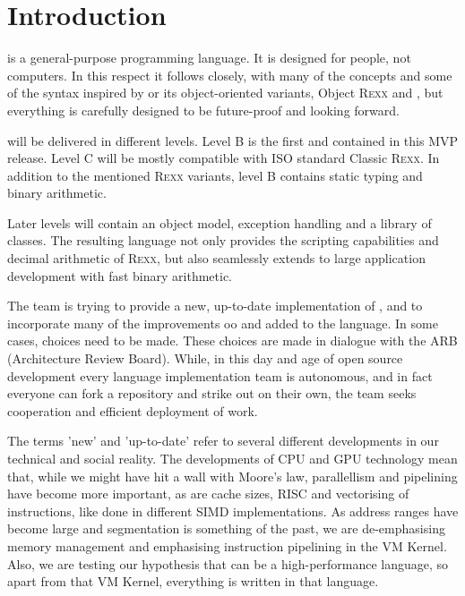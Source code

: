 \chapter{Introduction}

\crexx{} is a general-purpose programming language. It is designed for
people, not computers. In this respect it follows \rexx{} closely, with
many of the concepts and some of the syntax inspired by \rexx{}
or its object-oriented variants, Object R\textsc{exx} and \nr{}, but
everything is carefully designed to be future-proof and looking
forward.

\crexx{} will be delivered in different levels. Level B is the first and
contained in this MVP release. Level C will be mostly compatible with
ISO standard Classic \textsc{Rexx}. 
In addition to the mentioned \textsc{Rexx} variants, \crexx{} level B contains 
static typing and binary arithmetic.

Later levels will contain an object model, exception
handling and a library of classes. The resulting language not only provides the scripting
capabilities and decimal arithmetic of R\textsc{exx}, but also seamlessly
extends to large application development with fast binary arithmetic.

The \crexx{} team is trying to provide a new, up-to-date
implementation of \rexx{}, and to incorporate many of the improvements
oo\rexx{} and \nr{} added to the language. In some cases, choices
need to be made. These choices are made in dialogue with the \rexx ARB
(Architecture Review Board). While, in this day and age of open source
development every language implementation team is autonomous, and in
fact everyone can fork a repository and strike out on their own, the
\crexx{} team seeks cooperation and efficient deployment of work.

The terms 'new' and 'up-to-date' refer to several different
developments in our technical and social reality. The developments of
CPU and GPU technology mean that, while we might have hit a wall with
Moore's law, parallellism and pipelining have become more important,
as are cache sizes, RISC and vectorising of instructions, like done in
different SIMD implementations. As address ranges have become large
and segmentation is something of the past, we are de-emphasising
memory management and emphasising instruction pipelining in the
\crexx{} VM Kernel. Also, we are testing our hypothesis that \rexx{}
can be a high-performance language, so apart from that VM Kernel,
everything is written in that language.

